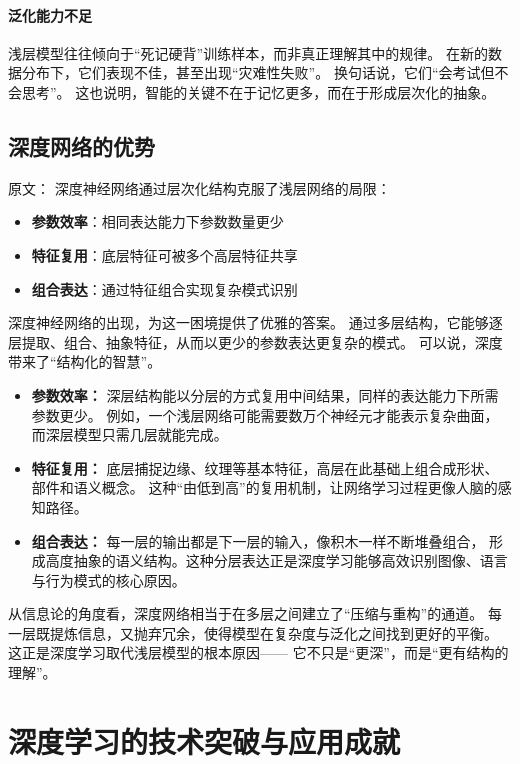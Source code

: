 \paragraph{泛化能力不足}  
浅层模型往往倾向于“死记硬背”训练样本，而非真正理解其中的规律。  
在新的数据分布下，它们表现不佳，甚至出现“灾难性失败”。  
换句话说，它们“会考试但不会思考”。  
这也说明，智能的关键不在于记忆更多，而在于形成层次化的抽象。


\subsection{深度网络的优势}

原文：
深度神经网络通过层次化结构克服了浅层网络的局限：
\begin{itemize}
\item {\bf 参数效率}：相同表达能力下参数数量更少
\item {\bf 特征复用}：底层特征可被多个高层特征共享
\item {\bf 组合表达}：通过特征组合实现复杂模式识别
\end{itemize}
深度神经网络的出现，为这一困境提供了优雅的答案。  
通过多层结构，它能够逐层提取、组合、抽象特征，从而以更少的参数表达更复杂的模式。  
可以说，深度带来了“结构化的智慧”。

\begin{itemize}
\item {\bf 参数效率：} 深层结构能以分层的方式复用中间结果，同样的表达能力下所需参数更少。  
例如，一个浅层网络可能需要数万个神经元才能表示复杂曲面，而深层模型只需几层就能完成。
\item {\bf 特征复用：} 底层捕捉边缘、纹理等基本特征，高层在此基础上组合成形状、部件和语义概念。  
这种“由低到高”的复用机制，让网络学习过程更像人脑的感知路径。
\item {\bf 组合表达：} 每一层的输出都是下一层的输入，像积木一样不断堆叠组合，  
形成高度抽象的语义结构。这种分层表达正是深度学习能够高效识别图像、语言与行为模式的核心原因。
\end{itemize}

从信息论的角度看，深度网络相当于在多层之间建立了“压缩与重构”的通道。  
每一层既提炼信息，又抛弃冗余，使得模型在复杂度与泛化之间找到更好的平衡。  
这正是深度学习取代浅层模型的根本原因——  
它不只是“更深”，而是“更有结构的理解”。

\section{深度学习的技术突破与应用成就}

